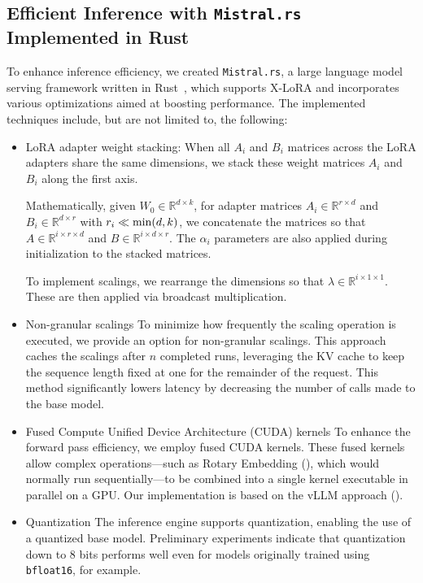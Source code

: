 \subsection{Efficient Inference with \texttt{Mistral.rs} Implemented in Rust} To enhance inference efficiency, we created \texttt{Mistral.rs}, a large language model serving framework written in Rust~\cite{matsakis2014rust}, which supports X-LoRA and incorporates various optimizations aimed at boosting performance. The implemented techniques include, but are not limited to, the following:

\begin{itemize}
    \item LoRA adapter weight stacking: When all $A_i$ and $B_i$ matrices across the LoRA adapters share the same dimensions, we stack these weight matrices $A_i$ and $B_i$ along the first axis.

Mathematically, given $W_0 \in \mathbb{R}^{d \times k}$, for adapter matrices $A_i \in \mathbb{R}^{r \times d}$ and $B_i \in \mathbb{R}^{d \times r}$ with $r_i \ll {\rm min} (d,k)$, we concatenate the matrices so that $A\in \mathbb{R}^{i \times r \times d}$ and $B\in \mathbb{R}^{i \times d \times r}$. The $\alpha_i$ parameters are also applied during initialization to the stacked matrices.

To implement scalings, we rearrange the dimensions so that $\lambda \in \mathbb{R} ^ {i \times 1 \times 1}$. These are then applied via broadcast multiplication.

\item Non-granular scalings To minimize how frequently the scaling operation is executed, we provide an option for non-granular scalings. This approach caches the scalings after $n$ completed runs, leveraging the KV cache to keep the sequence length fixed at one for the remainder of the request. This method significantly lowers latency by decreasing the number of calls made to the base model.

\item Fused Compute Unified Device Architecture (CUDA) kernels To enhance the forward pass efficiency, we employ fused CUDA kernels. These fused kernels allow complex operations—such as Rotary Embedding (\cite{su2021roformer}), which would normally run sequentially—to be combined into a single kernel executable in parallel on a GPU. Our implementation is based on the vLLM approach (\cite{kwon2023efficient}).

\item Quantization The inference engine supports quantization, enabling the use of a quantized base model. Preliminary experiments indicate that quantization down to 8 bits performs well even for models originally trained using \texttt{bfloat16}, for example.

\end{itemize}

